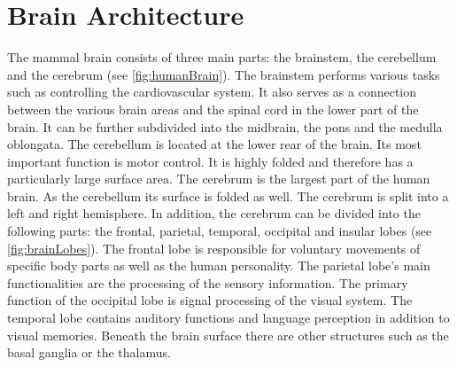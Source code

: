 \section{Brain Architecture}
%
The mammal brain consists of three main parts: the brainstem, the cerebellum and the cerebrum (see \cref{fig:humanBrain}).
% 
The brainstem performs various tasks such as controlling the cardiovascular system. It also serves as a connection between the various brain areas and the spinal cord in the lower part of the brain.
It can be further subdivided into the midbrain, the pons and the medulla oblongata.
The cerebellum is located at the lower rear of the brain.
Its most important function is motor control.
It is highly folded and therefore has a particularly large surface area.
The cerebrum is the largest part of the human brain.
As the cerebellum its surface is folded as well.
The cerebrum is split into a left and right hemisphere.
In addition, the cerebrum can be divided into the following parts:
the frontal, parietal, temporal, occipital and insular lobes (see \cref{fig:brainLobes}).
The frontal lobe is responsible for voluntary movements of specific body parts as well as the human personality.
The parietal lobe's main functionalities are the processing of the sensory information.
The primary function of the occipital lobe is signal processing of the visual system.
The temporal lobe contains auditory functions and language perception in addition to visual memories.
Beneath the brain surface there are other structures such as the basal ganglia or the thalamus.
\par
% 
